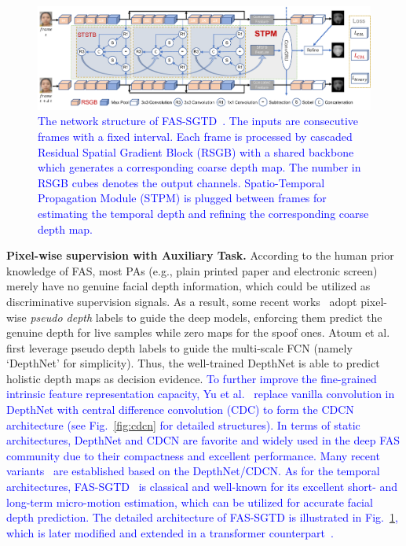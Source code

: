 \documentclass[10pt,journal,compsoc]{IEEEtran}
\begin{document}
\begin{figure}
\centering
\includegraphics[scale=0.6]{Figures/SGTD.pdf}
  \caption{ 
   \textcolor{blue}{The network structure of FAS-SGTD~\cite{wang2020deep}. The inputs are consecutive frames with a fixed interval. Each frame is processed by cascaded Residual Spatial Gradient Block (RSGB) with a shared backbone which generates a corresponding coarse depth map. The number in RSGB cubes denotes the output channels. Spatio-Temporal Propagation Module (STPM) is plugged between frames for estimating the temporal depth and refining the corresponding coarse depth map.}
  }
\label{fig:SGTD}
\end{figure}


\vspace{0.4em}
\noindent\textbf{Pixel-wise supervision with Auxiliary Task.}\quad
According to the human prior knowledge of FAS, most PAs (e.g., plain printed paper and electronic screen) merely have no genuine facial depth information, which could be utilized as discriminative supervision signals. As a result, some recent works~\cite{Atoum2018Face,peng2020ts,yu2020searching,wang2020deep} adopt pixel-wise \textit{pseudo depth} labels to guide the deep models, enforcing them predict the genuine depth for live samples while zero maps for the spoof ones. Atoum et al.~\cite{Atoum2018Face} first leverage pseudo depth labels to guide the multi-scale FCN (namely `DepthNet' for simplicity). Thus, the well-trained DepthNet is able to predict holistic depth maps as decision evidence. \textcolor{blue}{To further improve the fine-grained intrinsic feature representation capacity, Yu et al.~\cite{yu2020searching} replace vanilla convolution in DepthNet with central difference convolution (CDC) to form the CDCN architecture (see Fig.~\ref{fig:cdcn} for detailed structures). In terms of static architectures, DepthNet and CDCN are favorite and widely used in the deep FAS community due to their compactness and excellent performance. Many recent variants~\cite{yu2020fas2,yu2021dual,wu2021dual} are established based on the DepthNet/CDCN. As for the temporal architectures, FAS-SGTD~\cite{wang2020deep} is classical and well-known for its excellent short- and long-term micro-motion estimation, which can be utilized for accurate facial depth prediction. The detailed architecture of FAS-SGTD is illustrated in Fig.~\ref{fig:SGTD}, which is later modified and extended in a transformer counterpart~\cite{wang2022learning}.} 
\end{document}
